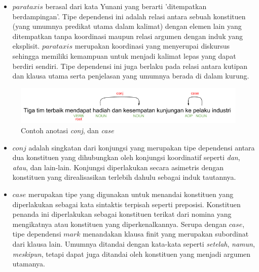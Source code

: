 \begin{itemize}
\item $parataxis$ berasal dari kata Yunani yang berarti 'ditempatkan berdampingan'. Tipe dependensi ini adalah relasi antara sebuah konstituen (yang umumnya predikat utama dalam kalimat) dengan elemen lain yang ditempatkan tanpa koordinasi maupun relasi argumen dengan induk yang eksplisit. $parataxis$ merupakan koordinasi yang menyerupai diskursus sehingga memiliki kemampuan untuk menjadi kalimat lepas yang dapat berdiri sendiri. Tipe dependensi ini juga berlaku pada relasi antara kutipan dan klausa utama serta penjelasan yang umumnya berada di dalam kurung.
\end{itemize}

\begin{figure}
	\centering \includegraphics[width=0.9
	\textwidth] {pics/anotasiconj.png} \caption{Contoh anotasi \textit{conj}, dan \textit{case}} 
\label{fig:anotasiconj} 
\end{figure}

\begin{itemize}
\item $conj$ adalah singkatan dari konjungsi yang merupakan tipe dependensi antara dua konstituen yang dihubungkan oleh konjungsi koordinatif seperti \textit{dan}, \textit{atau}, dan lain-lain. Konjungsi diperlakukan secara asimetris dengan konstituen yang direalisasikan terlebih dahulu sebagai induk tautannya.
\item $case$ merupakan tipe yang digunakan untuk menandai konstituen yang diperlakukan sebagai kata sintaktis terpisah seperti preposisi. Konstituen penanda ini diperlakukan sebagai konstituen terikat dari nomina yang mengikatnya atau konstituen yang diperkenalkannya. Serupa dengan $case$, tipe dependensi $mark$ menandakan klausa finit yang merupakan subordinat dari klausa lain. Umumnya ditandai dengan kata-kata seperti \textit{setelah}, \textit{namun}, \textit{meskipun}, tetapi dapat juga ditandai oleh konstituen yang menjadi argumen utamanya.
\end{itemize}


